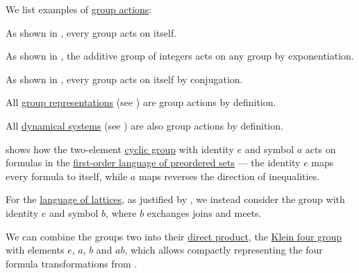 \begin{example}\label{ex:def:group_action}
  We list examples of \hyperref[def:group_action]{group actions}:
  \begin{thmenum}
     As shown in , every group acts on itself.

     As shown in , the additive group of integers acts on any group by exponentiation.

     As shown in , every group acts on itself by conjugation.

     All \hyperref[def:group_representation]{group representations} (see ) are group actions by definition.

     All \hyperref[def:dynamical_system]{dynamical systems} (see ) are also group actions by definition.

      shows how the two-element \hyperref[def:cyclic_group]{cyclic group} with identity \( e \) and symbol \( a \) acts on formulas in the \hyperref[def:preordered_set/theory]{first-order language of preordered sets} --- the identity \( e \) maps every formula to itself, while \( a \) maps reverses the direction of inequalities.

    For the \hyperref[def:lattice/theory]{language of lattices}, as justified by , we instead consider the group with identity \( e \) and symbol \( b \), where \( b \) exchanges joins and meets.

    We can combine the groups two into their \hyperref[def:first_order_direct_product]{direct product}, the \hyperref[def:klein_four_group]{Klein four group} with elements \( e \), \( a \), \( b \) and \( ab \), which allows compactly representing the four formula transformations from .
  \end{thmenum}
\end{example}

